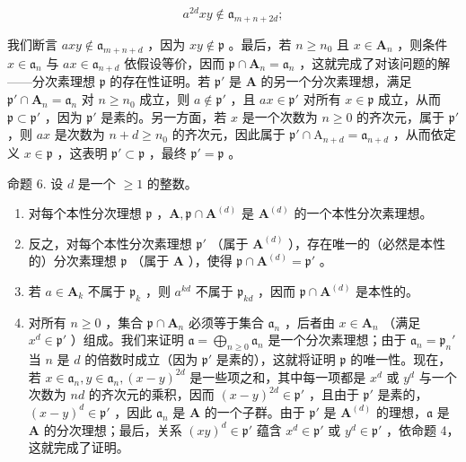 \[
a ^ {2d} x y \notin \mathfrak {a} _ {m + n + 2 d};
\]

我们断言 \(axy \notin \mathfrak{a}_{m+n+d}\) ，因为 \(xy \notin \mathfrak{p}\) 。最后，若 \(n \geqslant n_0\) 且 \(x \in \mathbf{A}_n\) ，则条件 \(x \in \mathfrak{a}_n\) 与 \(ax \in \mathfrak{a}_{n+d}\) 依假设等价，因而 \(\mathfrak{p} \cap \mathbf{A}_n = \mathfrak{a}_n\) ，这就完成了对该问题的解——分次素理想 \(\mathfrak{p}\) 的存在性证明。若 \(\mathfrak{p}'\) 是 \(\mathbf{A}\) 的另一个分次素理想，满足 \(\mathfrak{p}' \cap \mathbf{A}_n = \mathfrak{a}_n\) 对 \(n \geqslant n_0\) 成立，则 \(a \notin \mathfrak{p}'\) ，且 \(ax \in \mathfrak{p}'\) 对所有 \(x \in \mathfrak{p}\) 成立，从而 \(\mathfrak{p} \subset \mathfrak{p}'\) ，因为 \(\mathfrak{p}'\) 是素的。另一方面，若 \(x\) 是一个次数为 \(n \geqslant 0\) 的齐次元，属于 \(\mathfrak{p}'\) ，则 \(ax\) 是次数为 \(n + d \geqslant n_0\) 的齐次元，因此属于 \(\mathfrak{p}' \cap \mathrm{A}_{n+d} = \mathfrak{a}_{n+d}\) ，从而依定义 \(x \in \mathfrak{p}\) ，这表明 \(\mathfrak{p}' \subset \mathfrak{p}\) ，最终 \(\mathfrak{p}' = \mathfrak{p}\) 。

命题 6. 设 \(d\) 是一个 \(\geqslant 1\) 的整数。

\begin{enumerate}
\def\labelenumi{(\roman{enumi})}
\item
  对每个本性分次理想 \(\mathfrak{p}\) ，\(\mathbf{A},\mathfrak{p}\cap \mathbf{A}^{(d)}\) 是 \(\mathbf{A}^{(d)}\) 的一个本性分次素理想。
\item
  反之，对每个本性分次素理想 \(\mathfrak{p}'\) （属于 \(\mathbf{A}^{(d)}\) ），存在唯一的（必然是本性的）分次素理想 \(\mathfrak{p}\) （属于 \(\mathbf{A}\) ），使得 \(\mathfrak{p} \cap \mathbf{A}^{(d)} = \mathfrak{p}'\) 。
\item
  若 \(a \in \mathbf{A}_k\) 不属于 \(\mathfrak{p}_k\) ，则 \(a^{kd}\) 不属于 \(\mathfrak{p}_{kd}\) ，因而 \(\mathfrak{p} \cap \mathbf{A}^{(d)}\) 是本性的。
\item
  对所有 \(n \geqslant 0\) ，集合 \(\mathfrak{p} \cap \mathbf{A}_n\) 必须等于集合 \(\mathfrak{a}_n\) ，后者由 \(x \in \mathbf{A}_n\) （满足 \(x^d \in \mathfrak{p}'\) ）组成。我们来证明 \(\mathfrak{a} = \bigoplus_{n \geqslant 0} \mathfrak{a}_n\) 是一个分次素理想；由于 \(\mathfrak{a}_n = \mathfrak{p}_n'\) 当 \(n\) 是 \(d\) 的倍数时成立（因为 \(\mathfrak{p}'\) 是素的），这就将证明 \(\mathfrak{p}\) 的唯一性。现在，若 \(x \in \mathfrak{a}_n, y \in \mathfrak{a}_n, (x - y)^{2d}\) 是一些项之和，其中每一项都是 \(x^d\) 或 \(y^d\) 与一个次数为 \(nd\) 的齐次元的乘积，因而 \((x - y)^{2d} \in \mathfrak{p}'\) ，且由于 \(\mathfrak{p}'\) 是素的，\((x - y)^d \in \mathfrak{p}'\) ，因此 \(\mathfrak{a}_n\) 是 \(\mathbf{A}\) 的一个子群。由于 \(\mathfrak{p}'\) 是 \(\mathbf{A}^{(d)}\) 的理想，\(\mathfrak{a}\) 是 \(\mathbf{A}\) 的分次理想；最后，关系 \((xy)^d \in \mathfrak{p}'\) 蕴含 \(x^d \in \mathfrak{p}'\) 或 \(y^d \in \mathfrak{p}'\) ，依命题 4，这就完成了证明。
\end{enumerate}


